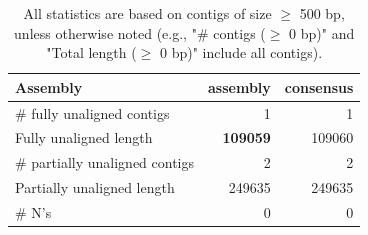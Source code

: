 \documentclass[12pt,a4paper]{article}
\begin{document}
\begin{table}[ht]
\begin{center}
\caption{All statistics are based on contigs of size $\geq$ 500 bp, unless otherwise noted (e.g., "\# contigs ($\geq$ 0 bp)" and "Total length ($\geq$ 0 bp)" include all contigs).}
\begin{tabular}{|l*{2}{|r}|}
\hline
Assembly & assembly & consensus \\ \hline
\# fully unaligned contigs & 1 & 1 \\ \hline
Fully unaligned length & {\bf 109059} & 109060 \\ \hline
\# partially unaligned contigs & 2 & 2 \\ \hline
Partially unaligned length & 249635 & 249635 \\ \hline
\# N's & 0 & 0 \\ \hline
\end{tabular}
\end{center}
\end{table}
\end{document}
